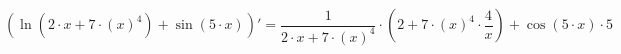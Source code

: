 \documentclass[12pt]{article}
\begin{document}
\[ \left(  \ln \left( 2 \cdot x+7 \cdot  \left( x \right) ^ {4}  \right) + \sin \left( 5 \cdot x \right) \right) ' =  \frac{1}{2 \cdot x+7 \cdot  \left( x \right) ^ {4} }  \cdot  \left( 2+7 \cdot  \left( x \right) ^ {4}  \cdot  \frac{4}{x}  \right) + \cos \left( 5 \cdot x \right)  \cdot 5 \]
\end{document}
